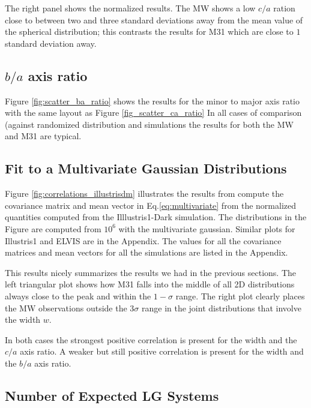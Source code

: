 \documentclass[a4paper,fleqn,usenatbib]{mnras}
\begin{document}
The right panel shows the normalized results. 
The MW shows a low $c/a$ ration close to between two and three
standard deviations away from the mean value of the spherical
distribution; this contrasts the results for M31 which are close to
$1$ standard deviation away. 


\subsection{$b/a$ axis ratio}

Figure \ref{fig:scatter_ba_ratio} shows the results for the minor to
major axis ratio with the same layout as Figure \ref{fig_scatter_ca_ratio}
In all cases of comparison (against randomized distribution
and simulations  the results for both the MW and M31 are typical. 


\subsection{Fit to a Multivariate Gaussian Distributions}



Figure \ref{fig:correlations_illustrisdm} illustrates the results from
 compute the covariance matrix and mean vector in
 Eq.\ref{eq:multivariate} from the normalized quantities computed from
 the Illlustris1-Dark simulation.
The distributions in the Figure are computed from $10^6$ with the multivariate
gaussian. 
Similar plots for Illustris1 and ELVIS are in the Appendix.
The values for all the covariance matrices and mean vectors for all
the simulations are listed in the Appendix.

This results nicely summarizes the results we had in the previous
sections. 
The left triangular plot shows how M31 falls into the middle of all 2D
distributions always close to the peak and within the $1-\sigma$
range. 
The right plot clearly places the MW observations outside the
$3\sigma$ range in the joint distributions that involve the width
$w$. 

In both cases the strongest positive correlation is present for the
width and the $c/a$ axis ratio. A weaker but still positive
correlation is present for the width and the $b/a$ axis ratio.



\subsection{Number of Expected LG Systems}
\end{document}
